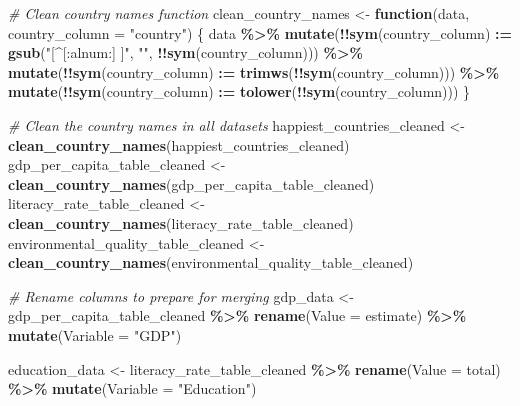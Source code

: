 \documentclass[
]{article}
\newenvironment{Shaded}{\begin{snugshade}}{\end{snugshade}}
\newcommand{\AttributeTok}[1]{\textcolor[rgb]{0.13,0.29,0.53}{#1}}
\newcommand{\CommentTok}[1]{\textcolor[rgb]{0.56,0.35,0.01}{\textit{#1}}}
\newcommand{\ControlFlowTok}[1]{\textcolor[rgb]{0.13,0.29,0.53}{\textbf{#1}}}
\newcommand{\FunctionTok}[1]{\textcolor[rgb]{0.13,0.29,0.53}{\textbf{#1}}}
\newcommand{\NormalTok}[1]{#1}
\newcommand{\OtherTok}[1]{\textcolor[rgb]{0.56,0.35,0.01}{#1}}
\newcommand{\SpecialCharTok}[1]{\textcolor[rgb]{0.81,0.36,0.00}{\textbf{#1}}}
\newcommand{\StringTok}[1]{\textcolor[rgb]{0.31,0.60,0.02}{#1}}
\begin{document}
\begin{Shaded}
\begin{Highlighting}[]
\CommentTok{\# Clean country names function}
\NormalTok{clean\_country\_names }\OtherTok{\textless{}{-}} \ControlFlowTok{function}\NormalTok{(data, }\AttributeTok{country\_column =} \StringTok{"country"}\NormalTok{) \{}
\NormalTok{  data }\SpecialCharTok{\%\textgreater{}\%}
    \FunctionTok{mutate}\NormalTok{(}\SpecialCharTok{!!}\FunctionTok{sym}\NormalTok{(country\_column) }\SpecialCharTok{:=} \FunctionTok{gsub}\NormalTok{(}\StringTok{"[\^{}[:alnum:] ]"}\NormalTok{, }\StringTok{""}\NormalTok{, }\SpecialCharTok{!!}\FunctionTok{sym}\NormalTok{(country\_column))) }\SpecialCharTok{\%\textgreater{}\%}
    \FunctionTok{mutate}\NormalTok{(}\SpecialCharTok{!!}\FunctionTok{sym}\NormalTok{(country\_column) }\SpecialCharTok{:=} \FunctionTok{trimws}\NormalTok{(}\SpecialCharTok{!!}\FunctionTok{sym}\NormalTok{(country\_column))) }\SpecialCharTok{\%\textgreater{}\%}
    \FunctionTok{mutate}\NormalTok{(}\SpecialCharTok{!!}\FunctionTok{sym}\NormalTok{(country\_column) }\SpecialCharTok{:=} \FunctionTok{tolower}\NormalTok{(}\SpecialCharTok{!!}\FunctionTok{sym}\NormalTok{(country\_column)))}
\NormalTok{\}}

\CommentTok{\# Clean the country names in all datasets}
\NormalTok{happiest\_countries\_cleaned }\OtherTok{\textless{}{-}} \FunctionTok{clean\_country\_names}\NormalTok{(happiest\_countries\_cleaned)}
\NormalTok{gdp\_per\_capita\_table\_cleaned }\OtherTok{\textless{}{-}} \FunctionTok{clean\_country\_names}\NormalTok{(gdp\_per\_capita\_table\_cleaned)}
\NormalTok{literacy\_rate\_table\_cleaned }\OtherTok{\textless{}{-}} \FunctionTok{clean\_country\_names}\NormalTok{(literacy\_rate\_table\_cleaned)}
\NormalTok{environmental\_quality\_table\_cleaned }\OtherTok{\textless{}{-}} \FunctionTok{clean\_country\_names}\NormalTok{(environmental\_quality\_table\_cleaned)}

\CommentTok{\# Rename columns to prepare for merging}
\NormalTok{gdp\_data }\OtherTok{\textless{}{-}}\NormalTok{ gdp\_per\_capita\_table\_cleaned }\SpecialCharTok{\%\textgreater{}\%}
  \FunctionTok{rename}\NormalTok{(}\AttributeTok{Value =}\NormalTok{ estimate) }\SpecialCharTok{\%\textgreater{}\%}
  \FunctionTok{mutate}\NormalTok{(}\AttributeTok{Variable =} \StringTok{"GDP"}\NormalTok{)}

\NormalTok{education\_data }\OtherTok{\textless{}{-}}\NormalTok{ literacy\_rate\_table\_cleaned }\SpecialCharTok{\%\textgreater{}\%}
  \FunctionTok{rename}\NormalTok{(}\AttributeTok{Value =}\NormalTok{ total) }\SpecialCharTok{\%\textgreater{}\%}
  \FunctionTok{mutate}\NormalTok{(}\AttributeTok{Variable =} \StringTok{"Education"}\NormalTok{)}


\end{Highlighting}
\end{Shaded}
\end{document}
